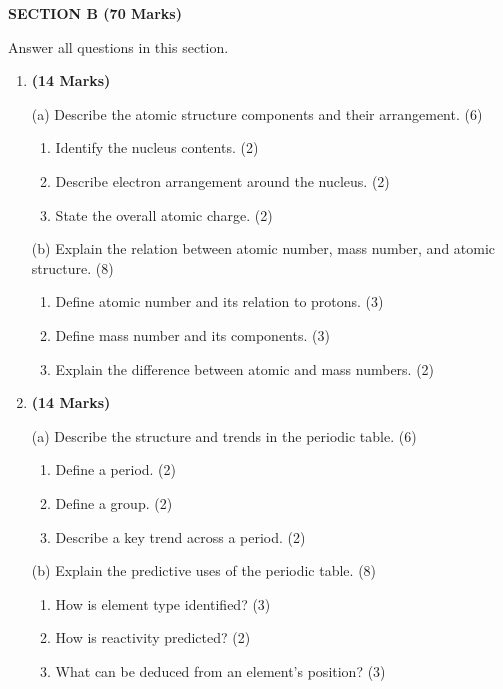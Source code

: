 \documentclass[12pt]{article}
\newcommand{\centerheading}[1]{
    \vspace{0.6em}
    \begin{center}
        {\fontsize{13}{15}\selectfont\bfseries #1}
    \end{center}
    \vspace{0.15em}
}
\newenvironment{questionblock}[1][10]{
    \par\Needspace{#1\baselineskip}
}{
    \par
}
\begin{document}
\centerheading{SECTION B (70 Marks)}
\vspace{-2.0em}
\begin{center}
  Answer all questions in this section.
\end{center}
\vspace{-2.0em}

\begin{enumerate}[start=3]
  \begin{questionblock}[15]
    \item \textbf{(14 Marks)}

    (a) Describe the atomic structure components and their arrangement. (6)
    \begin{enumerate}[label=(\roman*)]
      \item Identify the nucleus contents. (2)
      \item Describe electron arrangement around the nucleus. (2)
      \item State the overall atomic charge. (2)
    \end{enumerate}

    (b) Explain the relation between atomic number, mass number, and atomic structure. (8)
    \begin{enumerate}[label=(\roman*)]
      \item Define atomic number and its relation to protons. (3)
      \item Define mass number and its components. (3)
      \item Explain the difference between atomic and mass numbers. (2)
    \end{enumerate}
  \end{questionblock}

  \begin{questionblock}[15]
    \item \textbf{(14 Marks)}

    (a) Describe the structure and trends in the periodic table. (6)
    \begin{enumerate}[label=(\roman*)]
      \item Define a period. (2)
      \item Define a group. (2)
      \item Describe a key trend across a period. (2)
    \end{enumerate}

    (b) Explain the predictive uses of the periodic table. (8)
    \begin{enumerate}[label=(\roman*)]
      \item How is element type identified? (3)
      \item How is reactivity predicted? (2)
      \item What can be deduced from an element's position? (3)
    \end{enumerate}
  \end{questionblock}


\end{enumerate}
\end{document}
